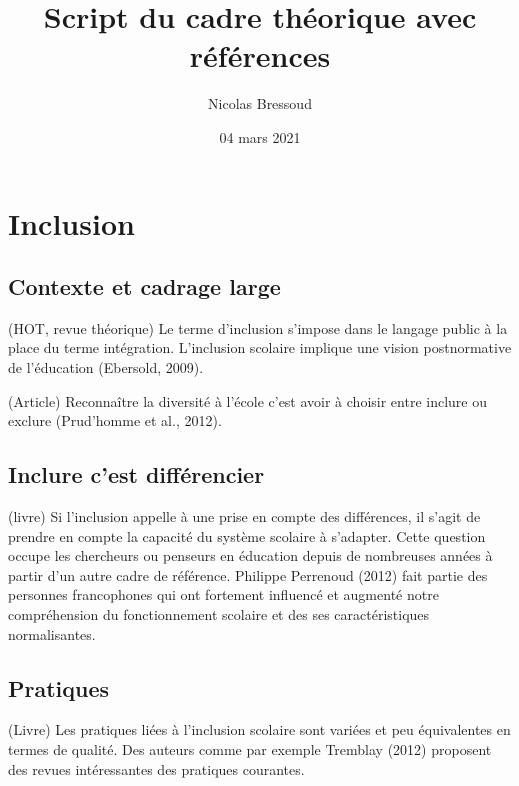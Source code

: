 \documentclass[
  french,
]{article}
\title{Script du cadre théorique avec références}
\author{Nicolas Bressoud}
\date{04 mars 2021}
\begin{document}
\maketitle

\renewcommand*\contentsname{Table des matières}
{
\setcounter{tocdepth}{2}
\tableofcontents
}
\hypertarget{inclusion}{%
\section{Inclusion}\label{inclusion}}

\hypertarget{contexte-et-cadrage-large}{%
\subsection{Contexte et cadrage large}\label{contexte-et-cadrage-large}}

(HOT, revue théorique) Le terme d'inclusion s'impose dans le langage public à la place du terme intégration. L'inclusion scolaire implique une vision postnormative de l'éducation (Ebersold, 2009).

(Article) Reconnaître la diversité à l'école c'est avoir à choisir entre inclure ou exclure (Prud'homme et al., 2012).

\hypertarget{inclure-cest-diffuxe9rencier}{%
\subsection{Inclure c'est différencier}\label{inclure-cest-diffuxe9rencier}}

(livre) Si l'inclusion appelle à une prise en compte des différences, il s'agit de prendre en compte la capacité du système scolaire à s'adapter. Cette question occupe les chercheurs ou penseurs en éducation depuis de nombreuses années à partir d'un autre cadre de référence. Philippe Perrenoud (2012) fait partie des personnes francophones qui ont fortement influencé et augmenté notre compréhension du fonctionnement scolaire et des ses caractéristiques normalisantes.

\hypertarget{pratiques}{%
\subsection{Pratiques}\label{pratiques}}

(Livre) Les pratiques liées à l'inclusion scolaire sont variées et peu équivalentes en termes de qualité. Des auteurs comme par exemple Tremblay (2012) proposent des revues intéressantes des pratiques courantes.
\end{document}
